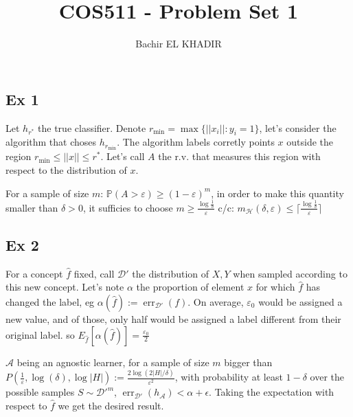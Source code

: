 \documentclass[12pt]{article}
\title{COS511 - Problem Set 1}
\author{Bachir EL KHADIR }
\newcommand{\Q}[1]{\subsection*{Ex #1}}
\newenvironment{question}[1]
{\Q{#1}}{}
\newcommand{\pr}{{\mathbb P}}
\DeclareMathOperator{\err}{err}
\begin{document}
\maketitle

\begin{question}{1}

Let $h_{r^*}$ the true classifier.
Denote $r_{\min} = \max \{ ||x_i|| : y_i = 1 \}$, let's consider the algorithm that choses $h_{r_{\min}}$.
The algorithm labels corretly points $x$ outside the region $r_{\min} \le ||x|| \le r^*$.
Let's call $A$ the r.v. that measures this region with respect to the distribution of $x$.

For a sample of size $m$: $\pr(A > \varepsilon) \ge (1 - \varepsilon)^m$, in order to make this quantity smaller than $\delta > 0$, it sufficies to choose $m \ge \frac{\log \frac1\delta}{\varepsilon}
$
c/c: $m_{\mathcal H}(\delta, \varepsilon) \le \lceil \frac{\log \frac1\delta}{\varepsilon} \rceil$
\end{question}
\begin{question}{2}
For a concept $\hat f$ fixed, call $\mathcal D'$ the distribution of $X, Y$ when sampled according to this new concept. Let's note $\alpha$ the proportion of element $x$ for which $\hat f$ has changed the label, eg $\alpha(\hat f) := \err_{\mathcal D'}(f)$. On average, $\varepsilon_0$ would be assigned a new value, and of those, only half would be assigned a label different from their original label. so $E_{\hat f}[\alpha(\hat f)] = \frac{\varepsilon_0}2$

$\mathcal A$ being an agnostic learner, for a sample of size $m$ bigger than $P(\frac1\varepsilon, \log(\delta), \log|H|) := \frac{2 \log(2 |H| / \delta)}{\varepsilon^2}$, with probability at least $1 - \delta$ over the possible samples $S \sim \mathcal {D'}^m$, $\err_{\mathcal D'}(h_{\mathcal A}) < \alpha + \epsilon$.
Taking the expectation with respect to $\hat f$ we get the desired result.
\end{question}
\end{document}
